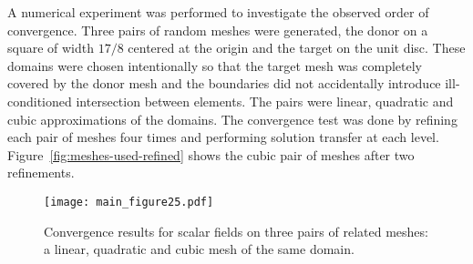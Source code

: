 \documentclass[letterpaper,10pt]{article}
\theoremstyle{definition}
\begin{document}
A numerical experiment was performed to investigate the observed order
of convergence. Three pairs of random meshes were generated, the donor
on a square of width \(17 / 8\) centered at the origin
and the target on the unit disc. These domains were chosen intentionally so
that the target mesh was completely covered by the donor mesh and the
boundaries did not accidentally introduce ill-conditioned intersection between
elements. The pairs were linear, quadratic and
cubic approximations of the domains. The convergence test was done by
refining each pair of meshes four times and performing solution transfer
at each level. Figure~\ref{fig:meshes-used-refined} shows the cubic
pair of meshes after two refinements.

\begin{figure}
  \texttt{[image: main\_figure25.pdf]}
  \centering
  \captionsetup{width=.75\linewidth}
  \caption{Convergence results for scalar fields on three pairs of related
    meshes: a linear, quadratic and cubic mesh of the same domain.}
  \label{fig:composite-errors}
\end{figure}
\end{document}
